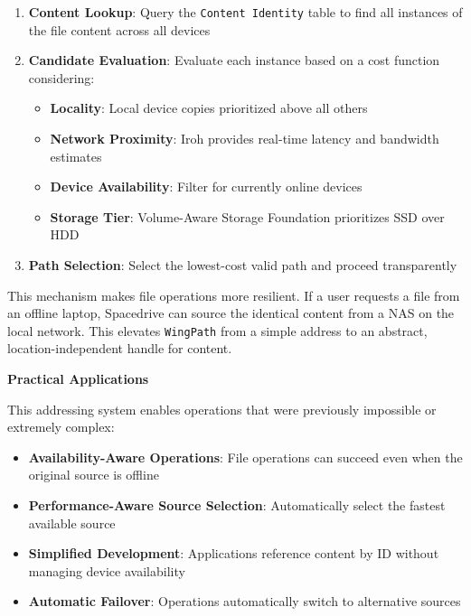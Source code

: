 \documentclass[sigconf]{acmart}
\begin{document}
\begin{enumerate}[noitemsep, topsep=0pt]
    \item \textbf{Content Lookup}: Query the \texttt{Content Identity} table to find all instances of the file content across all devices

    \item \textbf{Candidate Evaluation}: Evaluate each instance based on a cost function considering:
    \begin{itemize}[noitemsep]
        \item \textbf{Locality}: Local device copies prioritized above all others
        \item \textbf{Network Proximity}: Iroh provides real-time latency and bandwidth estimates
        \item \textbf{Device Availability}: Filter for currently online devices
        \item \textbf{Storage Tier}: Volume-Aware Storage Foundation prioritizes SSD over HDD
    \end{itemize}

    \item \textbf{Path Selection}: Select the lowest-cost valid path and proceed transparently
\end{enumerate}

This mechanism makes file operations more resilient. If a user requests a file from an offline laptop, Spacedrive can source the identical content from a NAS on the local network. This elevates \texttt{WingPath} from a simple address to an abstract, location-independent handle for content.

\textbf{Practical Applications}

This addressing system enables operations that were previously impossible or extremely complex:

\begin{itemize}[noitemsep, topsep=0pt]
 \item \textbf{Availability-Aware Operations}: File operations can succeed even when the original source is offline
 \item \textbf{Performance-Aware Source Selection}: Automatically select the fastest available source
 \item \textbf{Simplified Development}: Applications reference content by ID without managing device availability
 \item \textbf{Automatic Failover}: Operations automatically switch to alternative sources
\end{itemize}
\end{document}
